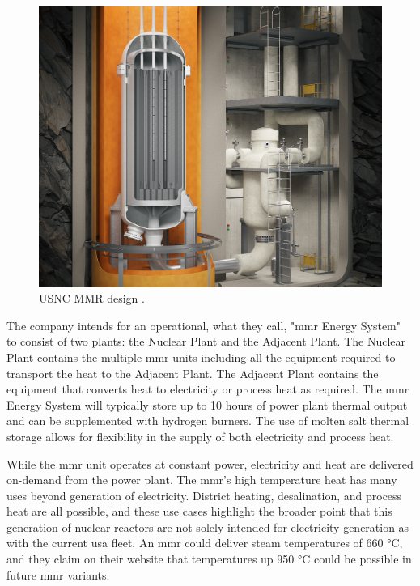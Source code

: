 \begin{figure}[H]
    \centering
    \includegraphics[scale=0.19]{images/reactor_design/wide-02.png}
    \caption{USNC MMR design \cite{usnc_design_2021}.}
    \label{fig:mmr_design}
\end{figure}

The company intends for an operational, what they call, "\gls{mmr} Energy System" to consist of two plants: the Nuclear Plant and the Adjacent Plant. The Nuclear Plant contains the multiple \gls{mmr} units including all the equipment required to transport the heat to the Adjacent Plant. The Adjacent Plant contains the equipment that converts heat to electricity or process heat as required. The \gls{mmr} Energy System will typically store up to 10 hours of power plant thermal output and can be supplemented with hydrogen burners. The use of molten salt thermal storage allows for flexibility in the supply of both electricity and process heat.

While the \gls{mmr} unit operates at constant power, electricity and heat are delivered on-demand from the power plant. The \gls{mmr}'s high temperature heat has many uses beyond generation of electricity. District heating, desalination, and process heat are all possible, and these use cases highlight the broader point that this generation of nuclear reactors are not solely intended for electricity generation as with the current \gls{usa} fleet. An \gls{mmr} could deliver steam temperatures of 660 °C, and they claim on their website that temperatures up 950 °C could be possible in future \gls{mmr} variants.

